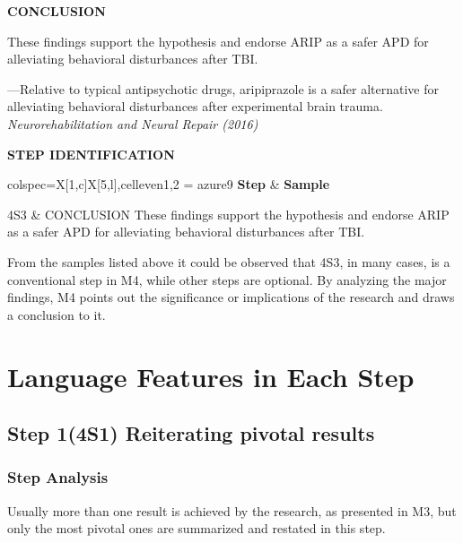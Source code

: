 \documentclass{ctexbook}
\begin{document}
\begin{sample}[label={myautocounter}]{\heiti}
  
  \textbf{CONCLUSION}
  
  These findings support the hypothesis and endorse ARIP as a safer APD for alleviating behavioral disturbances after TBI.


  \begin{flushright}
    ---Relative to typical antipsychotic drugs, aripiprazole is a safer alternative for alleviating behavioral disturbances after experimental brain trauma. \emph{Neurorehabilitation and Neural Repair (2016)}
  \end{flushright}

  \tcblower

  \noindent \textbf{STEP IDENTIFICATION}

  \vspace*{10pt}
  {\small\noindent
  \begin{tblr}{colspec={X[1,c]X[5,l]},cell{even}{1,2} = {azure9}}
    \toprule
    \textbf{Step} & \textbf{Sample} \\ 
    \midrule
  
    4S3 & CONCLUSION These findings support the hypothesis and endorse ARIP as a safer APD for alleviating behavioral disturbances after TBI.\\

    \bottomrule
  \end{tblr}
  }
  
\end{sample}

From the samples listed above it could be observed that 4S3, in many cases, is a conventional step in M4, while other steps are optional. By analyzing the major findings, M4 points out the significance or implications of the research and draws a conclusion to it.

\section{Language Features in Each Step}
  \subsection{Step 1(4S1) Reiterating pivotal results}
    \subsubsection{Step Analysis}

    Usually more than one result is achieved by the research, as presented in M3, but only the most pivotal ones are summarized and restated in this step.
\end{document}
